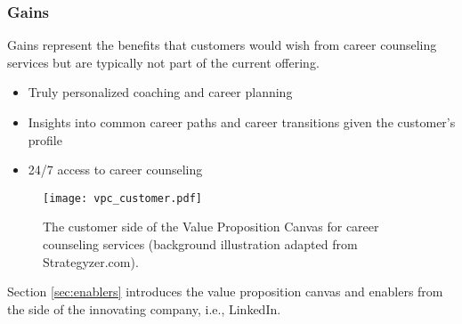 \subsubsection{Gains}

Gains represent the benefits that customers would wish from career counseling services but are 
typically not part of the current offering.

\begin{itemize}
    \item Truly personalized coaching and career planning
    \item Insights into common career paths and career transitions given the customer's profile
    \item 24/7 access to career counseling
\end{itemize}

\begin{figure}[h!]
    \centering
    \caption{The customer side of the Value Proposition Canvas for career counseling services (background illustration adapted from Strategyzer.com).}
    \label{fig:vpc_customer}
    \texttt{[image: vpc\_customer.pdf]}
\end{figure}

\vspace{0.5cm}
\noindent Section \ref{sec:enablers} introduces the value proposition canvas and enablers from the
side of the innovating company, i.e., LinkedIn.